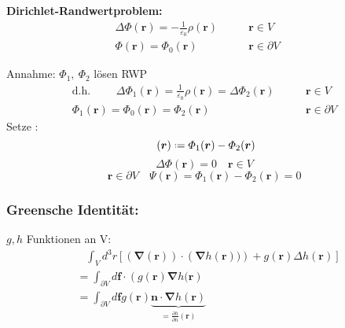 \documentclass[titlepage,11pt,a4paper,ngerman]{report}
\newcommand*{\defeq}{\mathrel{\vcenter{\baselineskip0.5ex \lineskiplimit0pt \hbox{\scriptsize.}\hbox{\scriptsize.}}}=}
\newcommand{\ub}[1]{\underbrace{#1}}
\newcommand{\pofr}{\Phi(\vec{r})}
\renewcommand{\Phi}{\varPhi}
\renewcommand{\vec}[1]{\boldsymbol{#1}}
\renewcommand{\epsilon}{\varepsilon}
\begin{document}
\begin{minipage}{.6\linewidth}
	\textbf{Dirichlet-Randwertproblem:}
	\begin{align*}
	\Delta \pofr = -\frac{1}{\epsilon_0} \rho(\vec{r}) &\qquad \vec{r} \in V\\
	\pofr = \Phi_0 (\vec{r}) \quad \; &\qquad \vec{r} \in \partial V \quad \;
	\end{align*}
\end{minipage}
\begin{minipage}{.4\linewidth}
	\centering
\end{minipage}
Annahme: $\Phi_1,\ \Phi_2$ lösen RWP
\begin{align*}
\textrm{d.h. }\qquad \Delta\Phi_1(\vec{r}) = \frac{1}{\epsilon_0} \rho(\vec{r}) = \Delta \Phi_2 (\vec{r}) &\qquad \vec{r} \in V\\
\Phi_1 (\vec{r}) = \Phi_0(\vec{r}) = \Phi_2(\vec{r}) \quad \ &\qquad \vec{r} \in \partial V
\end{align*}
Setze :
\begin{equation*}
\ (\vec{r}) \defeq \Phi_1(\vec{r}) - \Phi_2(\vec{r})
\end{equation*}
\begin{equation*}
\Delta \Phi(\vec{r}) = 0 \quad \vec{r} \in V 
\end{equation*}
\begin{equation*}
\vec{r} \in \partial V \quad \varPsi(\vec{r}) = \Phi_1(\vec{r}) - \Phi_2(\vec{r}) = 0
\end{equation*}

\subsubsection{Greensche Identität:}
$ g,h $ Funktionen an V:
\begin{align*}
&\ \ \ \, \int_V d^3 r \left[\left(\vec{\nabla} (\vec{r})\right) \cdot \left(\vec{\nabla} h(\vec{r}))\right) + g(\vec{r}) \Delta h(\vec{r})\right]\\
&= \int_{\partial V} d\vec{f} \cdot \left(g(\vec{r}) \vec{\nabla} h(\vec{r}\right)\\
&= \int_{\partial V} d\vec{f} g(\vec{r}) \ub{\vec{n} \cdot \vec{\nabla} h(\vec{r})}_{= \frac{\partial h}{\partial n} (\vec{r})}
\end{align*}
\end{document}
